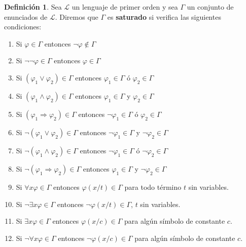\documentclass[a4paper,11pt]{article}
\theoremstyle{definition}
\newtheorem{defn}{Definición}[section]
\theoremstyle{remark}
\def\LL{\ensuremath{\mathcal{L}}}
\begin{document}
\begin{defn}
    Sea $\LL$ un lenguaje de primer orden y sea $\Gamma$ un conjunto de enunciados
    de $\LL$. Diremos que $\Gamma$ es \textbf{saturado} si verifica las
    siguientes condiciones:
    
    \begin{enumerate}
        \item Si $\varphi \in \Gamma$ entonces $\lnot \varphi \not\in \Gamma$
        
        \item Si $\lnot \lnot \varphi \in \Gamma$ entonces $\varphi \in \Gamma$
        
        \item Si $(\varphi_1 \lor \varphi_2) \in \Gamma$ entonces
        $\varphi_1 \in \Gamma$ ó $\varphi_2 \in \Gamma$

        \item Si $(\varphi_1 \land \varphi_2) \in \Gamma$ entonces
        $\varphi_1 \in \Gamma$ y $\varphi_2 \in \Gamma$

        \item Si $(\varphi_1 \Rightarrow \varphi_2) \in \Gamma$ entonces
        $\lnot \varphi_1 \in \Gamma$ ó $\varphi_2 \in \Gamma$

        \item Si $\lnot (\varphi_1 \lor \varphi_2) \in \Gamma$ entonces
        $\lnot \varphi_1 \in \Gamma$ y $\lnot \varphi_2 \in \Gamma$

        \item Si $\lnot (\varphi_1 \land \varphi_2) \in \Gamma$ entonces
        $\lnot \varphi_1 \in \Gamma$ ó $\lnot \varphi_2 \in \Gamma$

        \item Si $\lnot (\varphi_1 \Rightarrow \varphi_2) \in \Gamma$ entonces
        $\varphi_1 \in \Gamma$ y $\lnot \varphi_2 \in \Gamma$
        
        \item Si $\forall x \varphi \in \Gamma$ entonces
        $\varphi(x/t) \in \Gamma$ para todo término $t$ sin variables.

        \item Si $\lnot \exists x \varphi \in \Gamma$ entonces
        $\lnot \varphi(x/t) \in \Gamma$, $t$ sin variables.

        \item Si $\exists x \varphi \in \Gamma$ entonces
        $\varphi(x/c) \in \Gamma$ para algún símbolo de constante $c$.

        \item Si $\lnot \forall x \varphi \in \Gamma$ entonces
        $\lnot \varphi(x/c) \in \Gamma$ para algún símbolo de constante $c$.
    \end{enumerate}
\end{defn}
\end{document}
